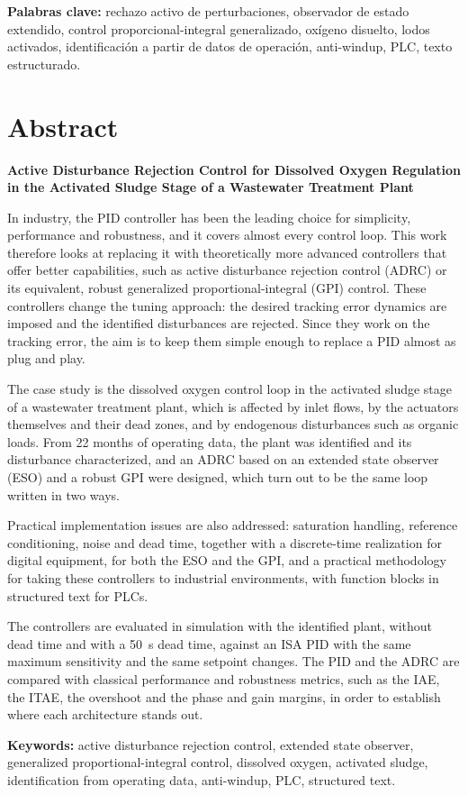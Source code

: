 \vspace{0.4cm}
\noindent
\textbf{Palabras clave:} rechazo activo de perturbaciones, observador de estado
extendido, control proporcional-integral generalizado, oxígeno disuelto, lodos
activados, identificación a partir de datos de operación, anti-windup,
PLC, texto estructurado.

\chapter*{Abstract}

\noindent
\textbf{Active Disturbance Rejection Control for Dissolved Oxygen Regulation in
the Activated Sludge Stage of a Wastewater Treatment Plant}

\vspace{0.3cm}
\noindent
In industry, the PID controller has been the leading choice for simplicity, performance and
robustness, and it covers almost every control loop. This work therefore looks at replacing it with
theoretically more advanced controllers that offer better capabilities, such as active disturbance
rejection control (ADRC) or its equivalent, robust generalized proportional-integral (GPI) control. These
controllers change the tuning approach: the desired tracking error dynamics are imposed and the
identified disturbances are rejected. Since they work on the tracking error, the aim is to keep them
simple enough to replace a PID almost as plug and play.

The case study is the dissolved oxygen control loop in the activated sludge stage of a wastewater
treatment plant, which is affected by inlet flows, by the actuators themselves and their dead zones,
and by endogenous disturbances such as organic loads. From 22 months of operating data, the plant was
identified and its disturbance characterized, and an ADRC based on an extended state observer (ESO)
and a robust GPI were designed, which turn out to be the same loop written in two ways.

Practical implementation issues are also addressed: saturation handling, reference conditioning,
noise and dead time, together with a discrete-time realization for digital equipment, for both the
ESO and the GPI, and a practical methodology for taking these controllers to industrial environments,
with function blocks in structured text for PLCs.

The controllers are evaluated in simulation with the identified plant, without dead time and with a
50~s dead time, against an ISA PID with the same maximum sensitivity and the same setpoint changes.
The PID and the ADRC are compared with classical performance and robustness metrics, such as the IAE,
the ITAE, the overshoot and the phase and gain margins, in order to establish where each architecture
stands out.

\vspace{0.4cm}
\noindent
\textbf{Keywords:} active disturbance rejection control, extended state
observer, generalized proportional-integral control, dissolved oxygen,
activated sludge, identification from operating data, anti-windup, PLC,
structured text.
